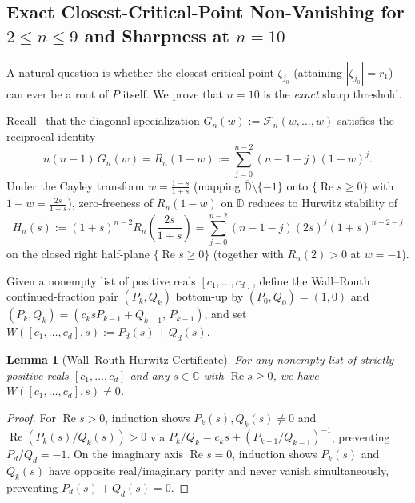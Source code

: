 \documentclass[11pt,a4paper]{article}
\newtheorem{lemma}[theorem]{Lemma}
\theoremstyle{definition}
\theoremstyle{remark}
\newcommand{\CC}{\mathbb{C}}
\newcommand{\DD}{\mathbb{D}}
\DeclareMathOperator{\RePart}{Re}
\begin{document}
\subsection{Exact Closest-Critical-Point Non-Vanishing for $2 \le n \le 9$ and Sharpness at $n = 10$}

A natural question is whether the closest critical point $\zeta_{j_0}$ (attaining $|\zeta_{j_0}| = r_1$) can ever be a root of $P$ itself. We prove that $n = 10$ is the \emph{exact} sharp threshold.

Recall~\cite{BesevicAllN} that the diagonal specialization $G_n(w) := \mathcal{F}_n(w, \dots, w)$ satisfies the reciprocal identity
\begin{equation}
\label{eq:gn-rn}
n(n - 1)\, G_n(w) = R_n(1 - w) := \sum_{j=0}^{n-2} (n - 1 - j)(1 - w)^j.
\end{equation}
Under the Cayley transform $w = \frac{1 - s}{1 + s}$ (mapping $\overline{\DD} \setminus \{-1\}$ onto $\{\RePart s \ge 0\}$ with $1 - w = \frac{2s}{1+s}$), zero-freeness of $R_n(1 - w)$ on $\overline{\DD}$ reduces to Hurwitz stability of
\[
H_n(s) := (1 + s)^{n-2} R_n\left(\frac{2s}{1+s}\right) = \sum_{j=0}^{n-2} (n - 1 - j)(2 s)^j (1 + s)^{n - 2 - j}
\]
on the closed right half-plane $\{\RePart s \ge 0\}$ (together with $R_n(2) > 0$ at $w = -1$).

Given a nonempty list of positive reals $[c_1, \dots, c_d]$, define the Wall--Routh continued-fraction pair $(P_k, Q_k)$ bottom-up by $(P_0, Q_0) = (1, 0)$ and $(P_k, Q_k) = (c_k s P_{k-1} + Q_{k-1},\, P_{k-1})$, and set $W([c_1, \dots, c_d], s) := P_d(s) + Q_d(s)$.

\begin{lemma}[Wall--Routh Hurwitz Certificate]
\label{lem:wall-routh}
For any nonempty list of strictly positive reals $[c_1, \dots, c_d]$ and any $s \in \CC$ with $\RePart s \ge 0$, we have $W([c_1, \dots, c_d], s) \neq 0$.
\end{lemma}

\begin{proof}
For $\RePart s > 0$, induction shows $P_k(s), Q_k(s) \neq 0$ and $\RePart(P_k(s)/Q_k(s)) > 0$ via $P_k/Q_k = c_k s + (P_{k-1}/Q_{k-1})^{-1}$, preventing $P_d/Q_d = -1$. On the imaginary axis $\RePart s = 0$, induction shows $P_k(s)$ and $Q_k(s)$ have opposite real/imaginary parity and never vanish simultaneously, preventing $P_d(s) + Q_d(s) = 0$.
\end{proof}
\end{document}
